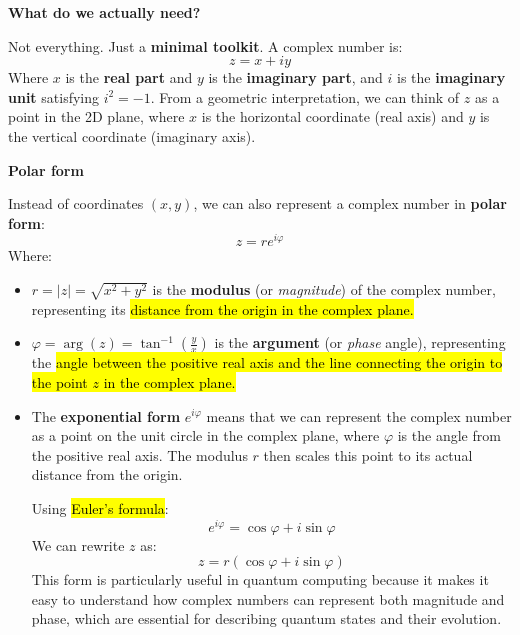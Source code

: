 \highspace
\begin{flushleft}
    \textcolor{Green3}{ \textbf{What do we actually need?}}
\end{flushleft}
Not everything. Just a \textbf{minimal toolkit}. A complex number is:
\begin{equation*}
    z = x + iy
\end{equation*}
Where $x$ is the \textbf{real part} and $y$ is the \textbf{imaginary part}, and $i$ is the \textbf{imaginary unit} satisfying $i^2 = -1$. From a geometric interpretation, we can think of $z$ as a point in the 2D plane, where $x$ is the horizontal coordinate (real axis) and $y$ is the vertical coordinate (imaginary axis).

\newpage

\begin{flushleft}
    \textcolor{Green3}{ \textbf{Polar form}}
\end{flushleft}
Instead of coordinates $(x, y)$, we can also represent a complex number in \textbf{polar form}:
\begin{equation*}
    z = re^{i \varphi}
\end{equation*}
Where:
\begin{itemize}
    \item $r = \left|z\right| = \sqrt{x^2 + y^2}$ is the \textbf{modulus} (or \emph{magnitude}) of the complex number, representing its \hl{distance from the origin in the complex plane.}
    \item $\varphi = \arg(z) = \tan^{-1} \left( \frac{y}{x} \right)$ is the \textbf{argument} (or \emph{phase} angle), representing the \hl{angle between the positive real axis and the line connecting the origin to the point $z$ in the complex plane.}
    \item The \textbf{exponential form} $e^{i \varphi}$ means that we can represent the complex number as a point on the unit circle in the complex plane, where $\varphi$ is the angle from the positive real axis. The modulus $r$ then scales this point to its actual distance from the origin.
    
    Using \hl{Euler's formula}:
    \begin{equation*}
        e^{i \varphi} = \cos \varphi + i \sin \varphi
    \end{equation*}
    We can rewrite $z$ as:
    \begin{equation*}
        z = r \left(\cos \varphi + i \sin \varphi\right)
    \end{equation*}
    This form is particularly useful in quantum computing because it makes it easy to understand how complex numbers can represent both magnitude and phase, which are essential for describing quantum states and their evolution.
\end{itemize}


